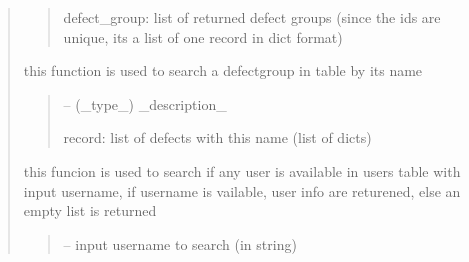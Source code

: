 \documentclass[letterpaper,10pt,english]{sphinxmanual}
\begin{document}
\begin{quote}
\begin{savenotes}
\begin{fulllineitems}
\begin{savenotes}
\begin{fulllineitems}
\begin{quote}
\begin{description}
\sphinxAtStartPar
defect\_group: list of returned defect groups (since the ids are unique, its a list of one record in dict format)

\end{description}\end{quote}

\end{fulllineitems}\end{savenotes}


\begin{savenotes}\begin{fulllineitems}
\label{\detokenize{setting/database_utils:oxin.database_utils.dataBaseUtils.search_defect_group_by_name}}
\pysigstartsignatures
{}
\pysigstopsignatures
\sphinxAtStartPar
this function is used to search a defect\sphinxhyphen{}group in table by its name
\begin{quote}\begin{description}
\sphinxAtStartPar
{} – (\_type\_) \_description\_

\sphinxAtStartPar
record: list of defects with this name (list of dicts)

\end{description}\end{quote}

\end{fulllineitems}\end{savenotes}


\begin{savenotes}\begin{fulllineitems}
\label{\detokenize{setting/database_utils:oxin.database_utils.dataBaseUtils.search_user}}
\pysigstartsignatures
{}
\pysigstopsignatures
\sphinxAtStartPar
this funcion is used to search if any user is available in users table with input username,
if username is vailable, user info are returened,
else an empty list is returned
\begin{quote}\begin{description}
\sphinxAtStartPar
{} – input username to search (in string)


\end{description}
\end{quote}
\end{fulllineitems}
\end{savenotes}
\end{fulllineitems}
\end{savenotes}
\end{quote}
\end{document}
